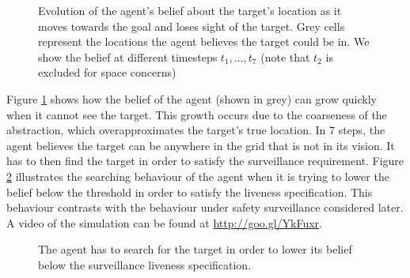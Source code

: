 \begin{figure}
\begin{minipage}{1\columnwidth}
\end{minipage}

	
	\caption{Evolution of the agent's belief about the target's location as it moves towards the goal and loses sight of the target. Grey cells represent the locations the agent believes the target could be in. We show the belief at different timesteps $t_1,\ldots,t_7$ (note that $t_2$ is excluded for space concerns)
		}
	\label{fig:case1exp}
	
\end{figure}

Figure \ref{fig:case1exp} shows how the belief of the agent (shown in grey) can grow quickly when it cannot see the target. This growth occurs due to the coarseness of the abstraction, which overapproximates the target's true location. In 7 steps, the agent believes the target can be anywhere in the grid that is not in its vision. It has to then find the target in order to satisfy the surveillance requirement. Figure \ref{fig:search} illustrates the searching behaviour of the agent when it is trying to lower the belief below the threshold in order to satisfy the liveness specification. This  behaviour contrasts with the behaviour under safety surveillance considered later. A video of the simulation can be found at \url{http://goo.gl/YkFuxr}.

\begin{figure}

	\begin{minipage}{1\columnwidth}
		\centering
	\end{minipage}
	\caption{The agent has to search for the target in order to lower its belief below the surveillance liveness specification.
	}
	\label{fig:search}
	
\end{figure}

